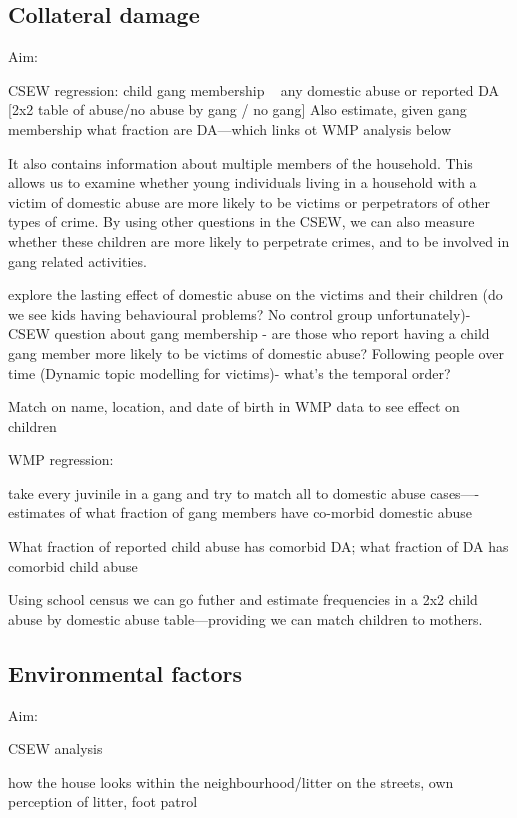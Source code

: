 \documentclass[11pt, a4paper]{article}
\begin{document}
\subsection{Collateral damage}

Aim:

CSEW regression: child gang membership ~ any domestic abuse or reported DA [2x2 table of abuse/no abuse by gang / no gang]
Also estimate, given gang membership what fraction are DA---which links ot WMP analysis below

It also contains information about  multiple members of the household. This allows us to examine whether young individuals living in a household with a victim of domestic abuse are more likely to be victims or perpetrators of other types of crime. By using other questions in the CSEW, we can also measure whether these children are more likely to perpetrate crimes, and to be involved in gang related activities.
 
 explore the lasting effect of domestic abuse on the victims and their children (do we see kids having behavioural problems? No control group unfortunately)- CSEW question about gang membership - are those who report having a child gang member more likely to be victims of domestic abuse? Following people over time (Dynamic topic modelling for victims)- what’s the temporal order? 

Match on name, location, and date of birth in WMP data to see effect on children

WMP regression:

take every juvinile in a gang and try to match all to domestic abuse cases----estimates of what fraction of gang members have co-morbid domestic abuse

What fraction of reported child abuse has comorbid DA; what fraction of DA has comorbid child abuse

Using school census we can go futher and estimate frequencies in a 2x2 child abuse  by domestic abuse table---providing we can match children to mothers.





\subsection{Environmental factors}


Aim:

CSEW analysis

how the house looks within the neighbourhood/litter on the streets, own perception of litter, foot patrol
\end{document}
